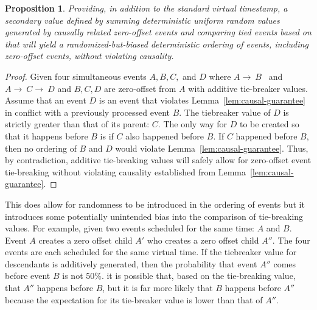 \documentclass[nonacm,sigconf]{acmart}
\newtheorem{proposition}{Proposition}
\begin{document}
\begin{proposition}\label{prop:biased-zero-offset}
  Providing, in addition to the standard virtual timestamp, a secondary value defined by summing deterministic uniform random values generated by causally related zero-offset events and comparing tied events based on that will yield a randomized-but-biased deterministic ordering of events, including zero-offset events, without violating causality.
\end{proposition}
\begin{proof}
  Given four simultaneous events $A,B,C,$ and $D$ where $A\rightarrow~B$~ and ~$A\rightarrow~C\rightarrow~D$ and $B,C,D$ are zero-offset from $A$ with additive tie-breaker values.
  Assume that an event $D$ is an event that violates Lemma~\ref{lem:causal-guarantee} in conflict with a previously processed event $B$. The tiebreaker value of $D$ is strictly greater than that of its parent: $C$. The only way for $D$ to be created so that it happens before $B$ is if $C$ also happened before $B$. If $C$ happened before $B$, then no ordering of $B$ and $D$ would violate Lemma~\ref{lem:causal-guarantee}. Thus, by contradiction, additive tie-breaking values will safely allow for zero-offset event tie-breaking without violating causality established from Lemma~\ref{lem:causal-guarantee}.
\end{proof}




This does allow for randomness to be introduced in the ordering of events but it introduces some potentially unintended bias into the comparison of tie-breaking values. For example, given two events scheduled for the same time: $A$ and $B$. Event $A$ creates a zero offset child $A'$ who creates a zero offset child $A''$. The four events are each scheduled for the same virtual time. If the tiebreaker value for descendants is additively generated, then the probability that event $A''$ comes before event $B$ is not 50\%. it is possible that, based on the tie-breaking value, that $A''$ happens before $B$, but it is far more likely that $B$ happens before $A''$ because the expectation for its tie-breaker value is lower than that of $A''$. 
\end{document}
